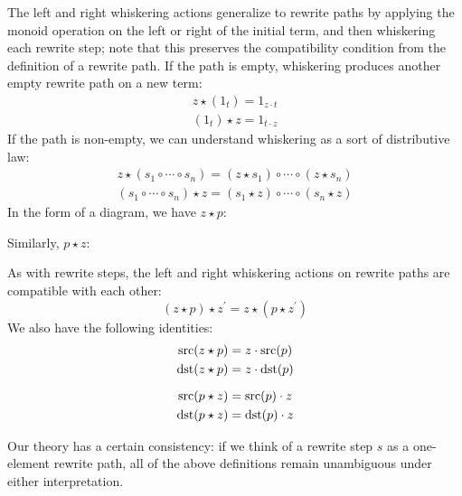 \documentclass[../generics]{subfiles}
\begin{document}
\begin{definition}
The left and right whiskering actions generalize to rewrite paths by applying the monoid operation on the left or right of the initial term, and then whiskering each rewrite step; note that this preserves the compatibility condition from the definition of a rewrite path. If the path is empty, whiskering produces another empty rewrite path on a new term:
\begin{gather*}
z\star (1_t) = 1_{z\cdot t}\\
(1_t)\star z = 1_{t\cdot z}
\end{gather*}
If the path is non-empty, we can understand whiskering as a sort of distributive law:
\begin{gather*}
z\star (s_1\circ\cdots\circ s_n) = (z\star s_1)\circ\cdots\circ (z\star s_n)\\
(s_1\circ\cdots\circ s_n)\star z = (s_1\star z)\circ\cdots\circ (s_n\star z)
\end{gather*}
In the form of a diagram, we have $z\star p$:
\begin{quote}
\end{quote}
Similarly, $p\star z$:
\begin{quote}
\end{quote}
As with rewrite steps, the left and right whiskering actions on rewrite paths are compatible with each other:
\[(z\star p)\star z^\prime = z\star(p\star z^\prime)\]
We also have the following identities:
\begin{gather*}
\operatorname{src}(z\star p)=z\cdot\operatorname{src}(p)\\
\operatorname{dst}(z\star p)=z\cdot\operatorname{dst}(p)\\[\medskipamount]
\operatorname{src}(p\star z)=\operatorname{src}(p)\cdot z\\
\operatorname{dst}(p\star z)=\operatorname{dst}(p)\cdot z
\end{gather*}

Our theory has a certain consistency: if we think of a rewrite step $s$ as a one-element rewrite path, all of the above definitions remain unambiguous under either interpretation.
\end{definition}%
\end{document}
